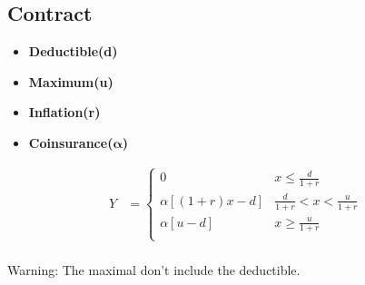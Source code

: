 \documentclass[10pt, french]{article}
\begin{document}
\begin{multicols*}{3}

\section*{Contract}
\begin{itemize}[align=left,leftmargin=*]
    \item \textbf{Deductible(d)}
    \item \textbf{Maximum(u)}
    \item \textbf{Inflation(r)}
    \item \textbf{Coinsurance($\boldsymbol{\alpha}$)}
\end{itemize}
\begin{align*}
    Y &= 
    \left\{ 
        \begin{array}{cc}
        0 & x \leq \frac{d}{1+r}\\
        \alpha[(1+r)x-d] & \frac{d}{1+r} < x < \frac{u}{1+r} \\
        \alpha[u - d] & x \geq \frac{u}{1+r} \\
        \end{array}  
    \right.
\end{align*} \\
{\color{red} Warning: The maximal don't include the deductible.}


\end{multicols*}
\end{document}
